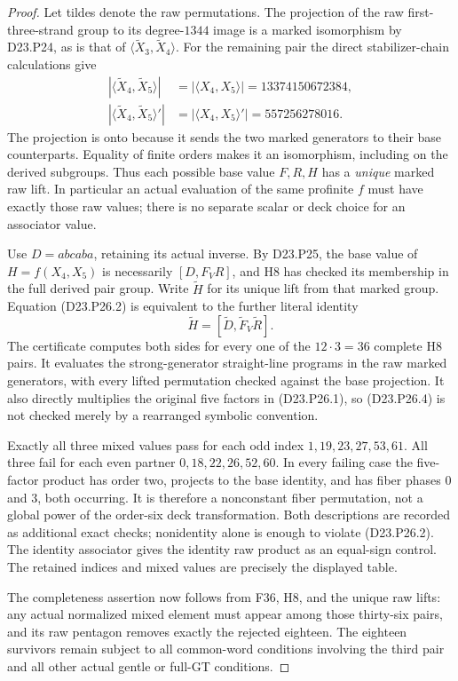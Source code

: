 \begin{proof}
Let tildes denote the raw permutations. The projection of
the raw first-three-strand group to its degree-$1344$
image is a marked isomorphism by D23.P24, as is that of
$\langle\widetilde X_3,\widetilde X_4\rangle$.
For the remaining pair the direct stabilizer-chain
calculations give
\[
\begin{split}
|\langle\widetilde X_4,\widetilde X_5\rangle|
  &=|\langle X_4,X_5\rangle|=13374150672384,\\
|\langle\widetilde X_4,\widetilde X_5\rangle'|
  &=|\langle X_4,X_5\rangle'|=557256278016.
\end{split}                                             \tag{D23.P26.3}
\]
The projection is onto because it sends the two marked
generators to their base counterparts. Equality of finite
orders makes it an isomorphism, including on the derived
subgroups. Thus each possible base value $F,R,H$ has a
\emph{unique} marked raw lift. In particular an actual
evaluation of the same profinite $f$ must have exactly
those raw values; there is no separate scalar or deck
choice for an associator value.

Use $D=abcaba$, retaining its actual inverse. By D23.P25,
the base value of $H=f(X_4,X_5)$ is necessarily
$[D,F_VR]$, and H8 has checked its membership in the
full derived pair group. Write $\widetilde H$ for its
unique lift from that marked group. Equation (D23.P26.2)
is equivalent to the further literal identity
\[
 \widetilde H=
 [\widetilde D,\widetilde F_V\widetilde R].
                                                        \tag{D23.P26.4}
\]
The certificate computes both sides for every one of the
$12\cdot3=36$ complete H8 pairs. It evaluates the
strong-generator straight-line programs in the raw marked
generators, with every lifted permutation checked against
the base projection. It also directly multiplies the
original five factors in (D23.P26.1), so (D23.P26.4)
is not checked merely by a rearranged symbolic convention.

Exactly all three mixed values pass for each odd index
$1,19,23,27,53,61$. All three fail for each even partner
$0,18,22,26,52,60$. In every failing case the five-factor
product has order two, projects to the base identity,
and has fiber phases $0$ and $3$, both occurring.
It is therefore a nonconstant fiber permutation, not a
global power of the order-six deck transformation.
Both descriptions are recorded as additional exact checks;
nonidentity alone is enough to violate (D23.P26.2).
The identity associator gives the identity raw product as
an equal-sign control. The retained indices and mixed
values are precisely the displayed table.

The completeness assertion now follows from F36, H8,
and the unique raw lifts: any actual normalized mixed
element must appear among those thirty-six pairs, and
its raw pentagon removes exactly the rejected eighteen.
The eighteen survivors remain subject to all common-word
conditions involving the third pair and all other actual
gentle or full-GT conditions.
\end{proof}

